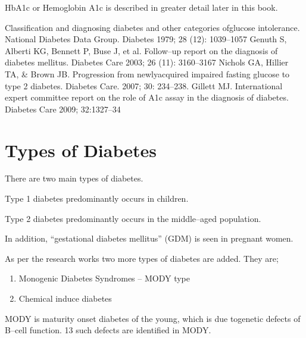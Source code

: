 HbA1c or Hemoglobin A1c is described in greater detail later in this book.

\begin{thebibliography}{99}
 Classification and diagnosing diabetes and other categories of\break glucose intolerance. National Diabetes Data Group. Diabetes 1979; 28 (12): 1039–1057
  Genuth S, Alberti KG, Bennett P, Buse J, et al. Follow–up report on the diagnosis of diabetes mellitus. Diabetes Care 2003; 26 (11): 3160–3167
  Nichols GA, Hillier TA, \& Brown JB. Progression from newly\break acquired impaired fasting glucose to type 2 diabetes. Diabetes Care. 2007; 30: 234–238.
  Gillett MJ. International expert committee report on the role of A1c assay in the diagnosis of diabetes. Diabetes Care 2009; 32:1327–34
 \end{thebibliography}


\chapter{Types of Diabetes}\label{chap6}

There are two main types of diabetes.

Type 1 diabetes predominantly occurs in children.

Type 2 diabetes predominantly occurs in the middle–aged popu\-lation.

In addition, “gestational diabetes mellitus” (GDM) is seen in pregnant women.

As per the research works two more types of diabetes are added. They are;

\begin{enumerate}[-]
\itemsep=0pt
\item Monogenic Diabetes Syndromes – MODY type
\item Chemical induce diabetes
\end{enumerate}

MODY is maturity onset diabetes of the young, which is due to\break genetic defects of B–cell function. 13 such defects are identified in MODY.

